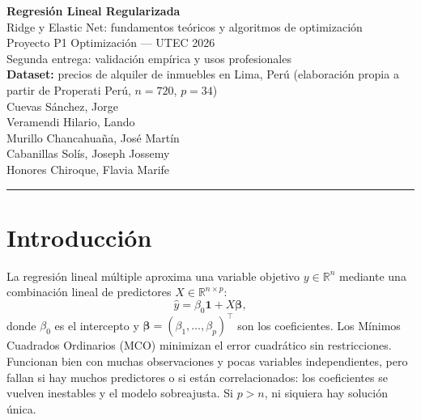 \documentclass[11pt,a4paper]{article}
\newcommand{\R}{\mathbb{R}}
\newcommand{\bt}{\bm{\beta}}
\theoremstyle{simple}
\begin{document}
\begin{center}
{\LARGE\bfseries\color{acento} Regresión Lineal Regularizada}\\[6pt]
{\Large Ridge y Elastic Net: fundamentos teóricos y algoritmos de optimización}\\[10pt]
{\large Proyecto P1 Optimización --- UTEC 2026 \\[2pt] Segunda entrega: validación empírica y usos profesionales}\\[4pt]
\textbf{Dataset:} precios de alquiler de inmuebles en Lima, Perú (elaboración propia a partir de Properati Perú, $n=720$, $p=34$)\\[8pt]
Cuevas Sánchez, Jorge \quad [202510326]\\[0pt]
Veramendi Hilario, Lando \quad [202210370]\\[0pt]
Murillo Chancahuaña, José Martín \quad [202510230]\\[0pt]
Cabanillas Solís, Joseph Jossemy \quad [202410347]\\[0pt]
Honores Chiroque, Flavia Marife \quad [202310550]
\end{center}
\vspace{2pt}\hrule\vspace{6pt}

\section{Introducción}
La regresión lineal múltiple aproxima una variable objetivo $y\in\R^n$ mediante una combinación lineal de predictores $X\in\R^{n\times p}$:
\begin{equation}
\hat y=\beta_0\mathbf 1+X\bt ,
\end{equation}
donde $\beta_0$ es el intercepto y $\bt=(\beta_1,\dots,\beta_p)^\top$ son los coeficientes. Los Mínimos Cuadrados Ordinarios (MCO) minimizan el error cuadrático sin restricciones. Funcionan bien con muchas observaciones y pocas variables independientes, pero fallan si hay muchos predictores o si están correlacionados: los coeficientes se vuelven inestables y el modelo sobreajusta. Si $p>n$, ni siquiera hay solución única.
\end{document}
